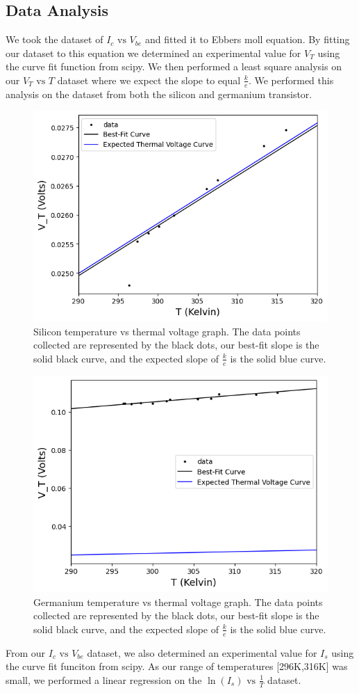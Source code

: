 \documentclass[12pt,letterpaper,twocolumn]{article}
\begin{document}
\subsection{Data Analysis}
We took the dataset of $I_c \text{ vs }V_{be}$ and fitted it to Ebbers moll equation.
By fitting our dataset to this equation we determined an experimental value for $V_T$ using the curve fit function from scipy.
We then performed a least square analysis on our $V_T \text{ vs } T$ dataset where we expect the slope to equal $\frac{k}{e}$. We performed this analysis on the dataset from both the silicon and germanium transistor. 

\begin{figure}[h]
	\includegraphics[width = .5\textwidth]{2_6SiBoltz.png}
	\caption{Silicon temperature vs thermal voltage graph. The data points collected are represented by the black dots, our best-fit slope is the solid black curve, and the expected slope of $\frac{k}{e}$ is the solid blue curve.\label{g1}}
\end{figure}
\begin{figure}[h]
	\includegraphics[width = .5\textwidth]{GeBoltz.png}
	\caption{Germanium temperature vs thermal voltage graph. The data points collected are represented by the black dots, our best-fit slope is the solid black curve, and the expected slope of $\frac{k}{e}$ is the solid blue curve.\label{g2}}
\end{figure}
From our $I_c \text{ vs } V_{be}$ dataset, we also determined an experimental value for $I_s$ using the curve fit funciton from scipy.
As our range of temperatures [296K,316K] was small, we performed a linear regression on the $\ln(I_s) \text{ vs }\frac{1}{T}$ dataset.
\end{document}
